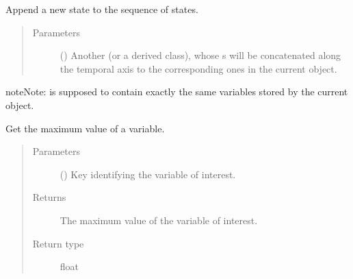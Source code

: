 \documentclass[letterpaper,10pt,english]{sphinxmanual}
\begin{document}
\begin{fulllineitems}
\begin{fulllineitems}
\label{\detokenize{api:storages.grid_data.GridData.append}}
Append a new state to the sequence of states.
\begin{quote}\begin{description}
\item[{Parameters}] \leavevmode
{} () \textendash{} Another {\hyperref[\detokenize{api:storages.grid_data.GridData}]{}} (or a derived class), whose s
will be concatenated along the temporal axis to the corresponding ones in the current object.

\end{description}\end{quote}

\begin{sphinxadmonition}{note}{Note:}
 is supposed to contain exactly the same variables stored by the current object.
\end{sphinxadmonition}

\end{fulllineitems}


\begin{fulllineitems}
\label{\detokenize{api:storages.grid_data.GridData.get_max}}
Get the maximum value of a variable.
\begin{quote}\begin{description}
\item[{Parameters}] \leavevmode
{} () \textendash{} Key identifying the variable of interest.

\item[{Returns}] \leavevmode
The maximum value of the variable of interest.

\item[{Return type}] \leavevmode
float

\end{description}\end{quote}

\end{fulllineitems}


\end{fulllineitems}
\end{document}
